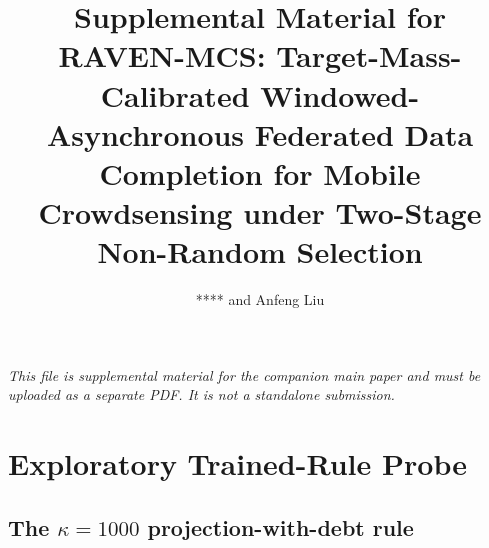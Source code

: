 \documentclass[letterpaper,journal]{IEEEtran}
\begin{document}
\title{Supplemental Material for\\
RAVEN-MCS: Target-Mass-Calibrated Windowed-Asynchronous Federated Data Completion for Mobile Crowdsensing under Two-Stage Non-Random Selection}

\author{**** and Anfeng Liu}

\maketitle

\noindent\textit{This file is supplemental material for the companion main paper
and must be uploaded as a separate PDF. It is not a standalone submission.}

\setcounter{figure}{4}
\setcounter{table}{4}
\setcounter{algorithm}{1}
\setcounter{equation}{43}
\setcounter{proposition}{4}
\setcounter{theorem}{2}
\setcounter{corollary}{0}
\setcounter{assumption}{1}



\section{Exploratory Trained-Rule Probe}
\label{app:trained_rule_probe}

\subsection{The $\kappa=1000$ projection-with-debt rule}
\label{app:kappa_probe}
\end{document}
